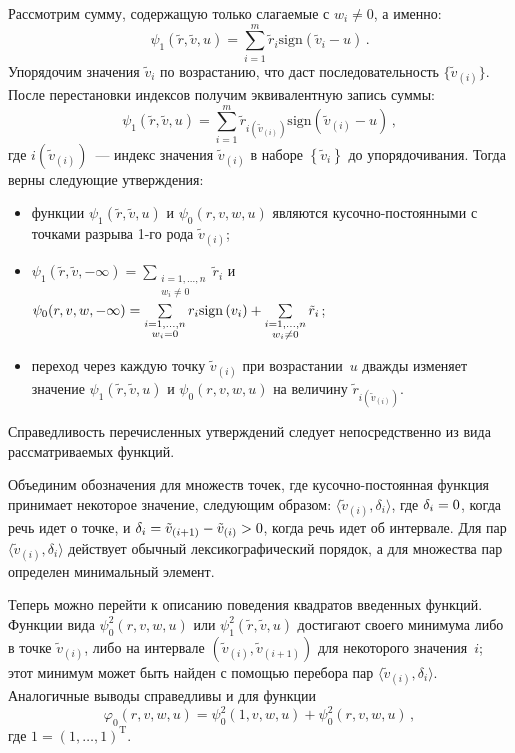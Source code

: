 \begin{multicols}{2}
\pagebreak

     Рассмотрим сумму, содержащую только сла\-га\-емые с $w_i\not= 0$, а
именно:
     $$
     \psi_1 (\tilde{r}, \tilde{v}, u) =\sum\limits_{i=1}^m \tilde{r}_i
     \mathrm{sign} \left(
\tilde{v}_i-u\right)\,.
     $$
Упорядочим значения $\tilde{v}_i$ по возрастанию, что даст
последовательность $\{ \tilde{v}_{(i)}\}$. После перестановки индексов
получим эквивалентную запись суммы:
$$
\psi_1(\tilde{r},\tilde{v},u) =\sum\limits_{i=1}^m
\tilde{r}_{i(\tilde{v}_{(i)})}
\mathrm{sign}  \left( \tilde{v}_{(i)}- u\right)\,,
$$
где $i(\tilde{v}_{(i)})$~--- индекс значения $\tilde{v}_{(i)}$ в наборе $\left\{
\tilde{v}_i\right\}$  до
упорядочивания. Тогда верны следующие утверж\-дения:
\begin{itemize}
\item функции $\psi_1(\tilde{r},\tilde{v},u)$ и $\psi_0(r,v,w,u)$ являются
ку\-соч\-но-по\-сто\-ян\-ны\-ми с точками разрыва 1-го рода $\tilde{v}_{(i)}$;
\item $\psi_1 (\tilde{r},\tilde{v}, -\infty) =
\sum\limits_{\substack{{i=1,\ldots ,n}\\{w_i\not=0}}} \tilde{r}_i $
и
$\psi_0(r,v,w,-\infty) \hm= \sum\limits_{\substack{{i=1,\ldots , n}\\
{w_i=0}}} r_i \mathrm{sign}\left(v_i\right) +
\sum\limits_{\substack{{i=1,\ldots ,n}\\{w_i\not=0}}} \tilde{r}_i$;
\item переход через каждую точку $\tilde{v}_{(i)}$ при возрастании~$u$
дважды изменяет значение $\psi_1(\tilde{r}, \tilde{v},u)$ и
$\psi_0(r,v,w,u)$ на величину $\tilde{r}_{i(\tilde{v}_{(i)})}$.
\end{itemize}
Справедливость перечисленных утверждений следует непосредственно из вида
рассматриваемых функций.

     Объединим обозначения для множеств точек, где
     ку\-соч\-но-по\-сто\-ян\-ная функция принимает некоторое значение,
следующим образом: $\langle \tilde{v}_{(i)}, \delta_i\rangle$, где
$\delta_i\hm=0$, когда речь идет о точке, и $\delta_i \hm = \tilde{v}_{(i+1)} \hm-
\tilde{v}_{(i)}\hm>0$, когда речь идет об интервале. Для пар $\langle \tilde{v}_{(i)},
\delta_i\rangle$ действует обычный лексикографический порядок, а для
множества пар определен минимальный элемент.

     Теперь можно перейти к описанию поведения квадратов введенных
функций. Функции вида $\psi_0^2(r,v,w,u)$ или $\psi_1^2(\tilde{r},
\tilde{v},u)$ достигают своего минимума либо в точке $\tilde{v}_{(i)}$, либо на
интервале $\left(\tilde{v}_{(i)}, \tilde{v}_{(i+1)}\right)$ для некоторого
значения~$i$; этот минимум может быть найден с помощью перебора пар
$\langle \tilde{v}_{(i)}, \delta_i\rangle$. Аналогичные выводы справедливы и для
функции
     $$
     \varphi_0(r,v,w,u) =\psi_0^2(1,v,w,u)+\psi_0^2(r,v,w,u)\,,
     $$
      где $1=(1, \ldots , 1)^{\mathrm{T}}$.


\end{multicols}
